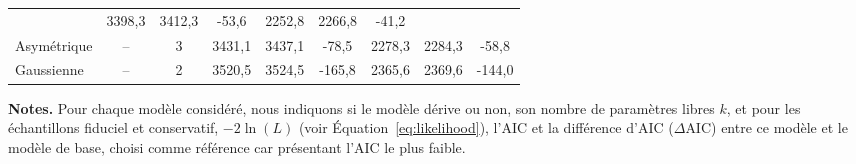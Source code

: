 \documentclass[../main/main.tex]{subfiles}
\begin{document}
\begin{landscape}
\begin{table}[p]
\begin{threeparttable}
\begin{tabular}{lcccccccc}
            & 3398,3 & 3412,3 & -53,6
            & 2252,8 & 2266,8 & -41,2 \\
            Asymétrique & -- & 3
            & 3431,1 & 3437,1 & -78,5
            & 2278,3 & 2284,3 & -58,8 \\
            Gaussienne & -- & 2
            & 3520,5 & 3524,5 & -165,8
            & 2365,6 & 2369,6 & -144,0 \\
            \bottomrule
        \end{tabular}
        \begin{tablenotes}[flushleft]
            \item\small \textbf{\hspace{-3.2pt}Notes.} Pour chaque modèle considéré,
                nous indiquons si le modèle dérive ou non, son nombre de
                paramètres libres $k$, et pour les échantillons fiduciel et
                conservatif, $-2\ln(L)$ (voir Équation~\ref{eq:likelihood}),
                l'AIC et la différence d'AIC ($\Delta$AIC) entre ce modèle et le
                modèle de base, choisi comme référence car présentant l'AIC le
                plus faible.
        \end{tablenotes}
    \end{threeparttable}
\end{table}
\end{landscape}

\end{document}
